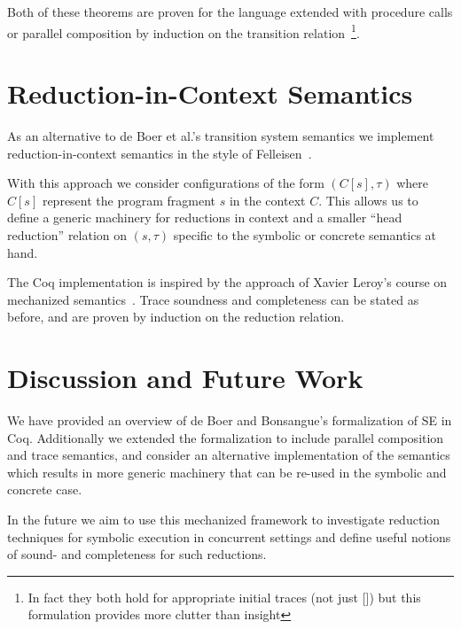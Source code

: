 \documentclass[submission,copyright,creativecommons]{eptcs}
\newcommand{\note}[1]{\color{BurntOrange}{#1}\color{black}}
\begin{document}
Both of these theorems are proven for the language extended with procedure calls or parallel composition
by induction on the transition relation~\footnote{In fact they both hold for appropriate initial traces (not just [])
but this formulation provides more clutter than insight}.

\section{Reduction-in-Context Semantics}
As an alternative to de Boer et al.'s transition system semantics we implement reduction-in-context semantics in the
style of Felleisen~\cite{FELLEISEN1992235}.

With this approach we consider configurations of the form $(C[s], \tau)$ where $C[s]$ represent the program fragment
$s$ in the context $C$. This allows us to define a generic machinery for reductions in context and a smaller
``head reduction'' relation on $(s, \tau)$ specific to the symbolic or concrete semantics at hand.
\note{examples?}

The Coq implementation is inspired by the approach of Xavier Leroy's course on mechanized semantics~\cite{Leroy2020}.
Trace soundness and completeness can be stated as before, and are proven by induction on the reduction relation.

\section{Discussion and Future Work}
We have provided an overview of de Boer and Bonsangue's formalization of SE in Coq.
Additionally we extended the formalization to include parallel composition and trace semantics,
and consider an alternative implementation of the semantics which results in more generic machinery
that can be re-used in the symbolic and concrete case.

In the future we aim to use this mechanized framework to investigate reduction techniques for symbolic
execution in concurrent settings and define useful notions of sound- and completeness for such reductions.



\end{document}
